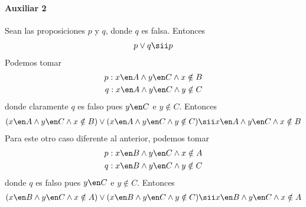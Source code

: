 \begin{enumerate}[label=\roman*)]
        \paragraph{Auxiliar 2}{
          Sean las proposiciones $p$ y $q$, donde $q$ es falsa. Entonces
          \begin{align*}
            p \lor q \sii p
          \end{align*}
          Podemos tomar
          \begin{align*}
            p: x \en A \land y \en C \land x \notin B \\
            q: x \en A \land y \en C \land y \notin C
          \end{align*}
          donde claramente $q$ es falso pues $y \en C$ e $y \notin C$. Entonces
          \begin{align*}
            (x \en A \land y \en C \land x \notin B) \lor (x \en A \land y \en C \land y \notin C)
            \sii x \en A \land y \en C \land x \notin B
          \end{align*}
          Para este otro caso diferente al anterior, podemos tomar
          \begin{align*}
            p: x \en B \land y \en C \land x \notin A \\
            q: x \en B \land y \en C \land y \notin C
          \end{align*}
          donde $q$ es falso pues $y \en C$ e $y \notin C$. Entonces
          \begin{align*}
            (x \en B \land y \en C \land x \notin A) \lor (x \en B \land y \en C \land y \notin C)
            \sii x \en B \land y \en C \land x \notin A
          \end{align*}
        }
\end{enumerate}

\begin{aportes}
  \item {}
  \item {}
\end{aportes}
